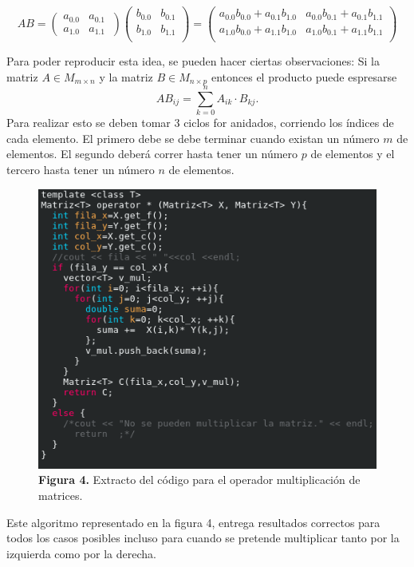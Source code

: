 \documentclass[10pt,letterpaper]{article}
\begin{document}
\begin{enumerate}
\begin{enumerate}
  \[AB=\left( \begin{array}{ll}
               a_{0.0}& a_{0.1}\\
               a_{1.0}& a_{1.1}\
             \end{array}\right)\left( \begin{array}{ll}
               b_{0.0}& b_{0.1}\\
               b_{1.0}& b_{1.1}\\
             \end{array}\right)=\left( \begin{array}{ll}
               a_{0.0}b_{0.0}+a_{0.1}b_{1.0}& a_{0.0}b_{0.1}+a_{0.1}b_{1.1}\\
               a_{1.0}b_{0.0}+a_{1.1}b_{1.0}& a_{1.0}b_{0.1}+a_{1.1}b_{1.1}\\
                                       \end{array}\right)\]

                                   Para poder reproducir esta idea, se pueden hacer ciertas observaciones: Si la matriz $A \in M_{m\times n}$ y la matriz $B \in M_{n\times p}$ entonces el producto puede espresarse $$AB_{ij}=\sum_{k=0}^{n} A_{ik}\cdot B_{kj} .$$ Para realizar esto se deben tomar 3 ciclos for anidados, corriendo los índices de cada elemento. El primero debe se debe terminar cuando existan un número $m$ de elementos. El segundo deberá correr hasta tener un número $p$ de elementos y el tercero hasta tener un número $n$ de elementos.
                                    
\begin{figure}[H]
\begin{center}
\includegraphics[scale=0.4]{multiplicacion}\\
\textbf{Figura 4.} Extracto del código para el operador multiplicación de matrices. 
\end{center}
\end{figure}
Este algoritmo representado en la figura 4, entrega resultados correctos para todos los casos posibles incluso para cuando se pretende multiplicar tanto por la izquierda como por la derecha.


\end{enumerate}
\end{enumerate}
\end{document}
